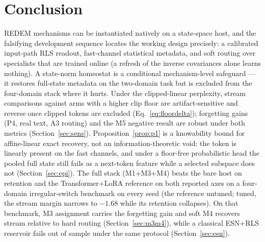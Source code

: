 \documentclass[preprint,12pt]{elsarticle}
\begin{document}
\section{Conclusion}

REDEM mechanisms can be instantiated natively on a state-space host,
and the falsifying development sequence locates the working design
precisely: a calibrated input-path RLS readout, fast-channel statistical
metadata, and soft routing over specialists that are trained online (a
refresh of the inverse covariances alone learns nothing). A
state-norm homeostat is a conditional mechanism-level safeguard --- it
restores full-state metadata on the two-domain task but is excluded
from the four-domain stack where it hurts. Under the clipped-linear
perplexity, stream comparisons against arms with a higher clip floor
are artifact-sensitive and reverse once clipped tokens are excluded
(Eq.~\eqref{eq:floordelta}); forgetting gains (P4, real text, A3 routing)
and the M5 negative result are robust under both metrics
(Section~\ref{sec:sens}). Proposition~\ref{prop:p1} is a
knowability bound for affine-linear exact recovery, not an
information-theoretic void: the token is linearly present on the fast
channels, and under a floor-free probabilistic head the pooled full
state still fails as a next-token feature while a selected subspace
does not (Section~\ref{sec:epi}). The full stack (M1+M3+M4)
beats the bare host on retention and the
Transformer+LoRA reference on both reported axes on a
four-domain irregular-switch benchmark on every seed (the reference
untuned; tuned, the stream margin narrows to $-1.68$ while its
retention collapses). On that benchmark, M3 assignment carries the
forgetting gain and soft M4 recovers stream relative to hard routing
(Section~\ref{sec:m3m4}), while a classical ESN+RLS reservoir fails
out of sample under the same protocol (Section~\ref{sec:esn}).
\end{document}
